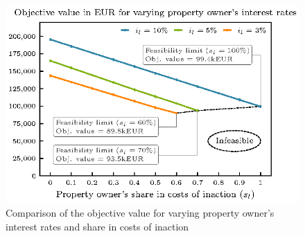 \begin{figure}[h]
	\centering
	\includegraphics[width=0.85\linewidth]{figures/4_Results/fig_feasible/feasible.eps}
	\caption{Comparison of the objective value for varying property owner's interest rates and share in costs of inaction}
	\label{fig:feasible}
\end{figure}




